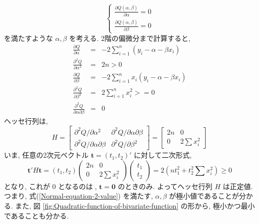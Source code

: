 \documentclass{jsarticle}
\theoremstyle{plain}
\begin{document}
  \begin{equation}
  \label{Normal-equation-2-value}
    \begin{cases}
      \frac{\partial Q(\alpha, \beta)}{\partial \alpha} = 0 \\
      \frac{\partial Q(\alpha, \beta)}{\partial \beta} = 0
    \end{cases}
  \end{equation}
  を満たすような $\alpha, \beta$ を考える. 2階の偏微分まで計算すると,
  \begin{eqnarray}
    \frac{\partial Q}{\partial \alpha} &=& -2 \sum_{i=1}^n (y_i - \alpha - \beta x_i) \\
    \frac{\partial^2 Q}{\partial \alpha^2} &=& 2n > 0 \\
    \frac{\partial Q}{\partial \beta} &=& -2\sum_{i=1}^n x_i (y_i - \alpha - \beta x_i) \\
    \frac{\partial^2 Q}{\partial \beta^2} &=& 2 \sum_{i=1}^n x_i^2 >= 0 \\
    \frac{\partial^2 Q}{\partial \alpha \partial \beta} &=& 0
  \end{eqnarray}
  ヘッセ行列は,
  \begin{equation}
    H = 
    \left[
      \begin{array}{cc}
        \partial^2 Q / \partial \alpha^2 & \partial^2 Q/\partial \alpha \partial \beta \\
        \partial^2 Q/\partial \alpha \partial \beta & \partial^2 Q / \partial \beta^2
      \end{array}
    \right]
    = \left[
      \begin{array}{cc}
        2n & 0 \\
        0 & 2 \sum x_i^2
      \end{array}
    \right]
  \end{equation}
  いま, 任意の2次元ベクトル $\bm{t} = (t_1, t_2)'$ に対して二次形式,
  \begin{equation}
    \bm{t}'H\bm{t} = (t_1, t_2) \left(
      \begin{array}{cc}
        2n & 0 \\
        0 & 2 \sum x_i^2
      \end{array}
    \right) \left( 
      \begin{array}{c}
        t_1 \\
        t_2
      \end{array}
    \right) = 2\left(nt_1^2 + t_2^2 \sum x_i^2 \right) \geq 0
  \end{equation}
  となり, これが $0$ となるのは, $\bm{t}=\bm{0}$ のときのみ. よってヘッセ行列 $H$ は正定値. つまり, 式(\ref{Normal-equation-2-value}) を満たす,
  $\alpha, \beta$ が極小値であることが分かる. また, 図 \ref{fig:Quadratic-function-of-bivariate-function} の形から, 極小かつ最小であることも分かる.
\end{document}
